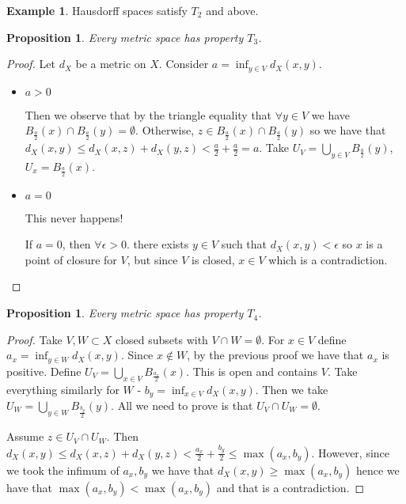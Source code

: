 \documentclass{article}
\theoremstyle{definition}
\newtheorem{exmp}{Example}[section]
\theoremstyle{plain}%
\newtheorem{prop}[thm]{Proposition}
\theoremstyle{remark}
\newcommand{\Union}{\bigcup}
\newcommand{\intersection}{\cap}
\begin{document}
\begin{exmp}
    Hausdorff spaces satisfy $T_2$ and above.
\end{exmp}

\begin{prop}
    Every metric space has property $T_3$.
\end{prop}

\begin{proof}
    Let $d_X$ be a metric on $X$. Consider $a = \inf_{y \in V} d_X(x,y)$.
    \begin{itemize}
        \item $a > 0$
        
            Then we observe that by the triangle equality that $\forall y \in V$ we have $B_{\frac{a}{2}}(x) \intersection B_{\frac{a}{2}}(y) = \emptyset$. Otherwise, $z \in B_{\frac{a}{2}}(x) \intersection B_{\frac{a}{2}}(y)$ so we have that $d_X(x,y) \le d_X(x,z) + d_X(y,z) < \frac{a}{2} + \frac{a}{2} = a$. Take $U_V = \Union_{y \in V} B_{\frac{a}{2}} (y)$, $U_x = B_{\frac{a}{2}} (x)$.
        \item $a=0$
        
            This never happens!
            
            If $a = 0$, then $\forall \epsilon > 0$. there exists $y \in V$ such that $d_X(x,y) < \epsilon$ so $x$ is a point of closure for $V$, but since $V$ is closed, $x \in V$ which is a contradiction. 
    \end{itemize}
\end{proof}

\begin{prop}
    Every metric space has property $T_4$.
\end{prop}

\begin{proof}
    Take $V,W \subset X$ closed subsets with $V \intersection W = \emptyset$. For $x \in V$ define $a_x = \inf_{y \in W} d_X(x,y)$. Since $x \not\in W$, by the previous proof we have that $a_x$ is positive. Define $U_V = \Union_{x \in V} B_{\frac{a_x}{2}}(x)$. This is open and contains $V$. Take everything similarly for $W$ - $b_y = \inf_{x \in V} d_X(x,y)$. Then we take $U_W = \Union_{y \in W} B_{\frac{b_y}{2}}(y)$. All we need to prove is that $U_V \intersection U_W = \emptyset$.
    
    Assume $z \in U_V \intersection U_W$. Then $d_X(x,y) \le d_X(x,z) + d_X(y,z) < \frac{a_x}{2} + \frac{b_y}{2} \le \max(a_x, b_y)$. However, since we took the infimum of $a_x, b_y$ we have that $d_X(x,y) \ge \max(a_x,b_y)$ hence we have that $\max(a_x,b_y) < \max(a_x,b_y)$ and that is a contradiction.
\end{proof}
\end{document}
